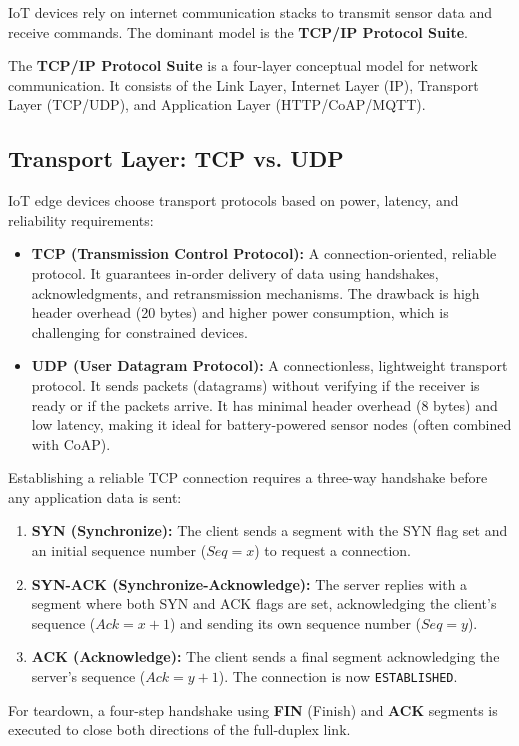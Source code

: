 \documentclass[12pt,a4paper]{article}
\begin{document}
IoT devices rely on internet communication stacks to transmit sensor data and receive commands. The dominant model is the \textbf{TCP/IP Protocol Suite}.

\begin{tcolorbox}[defbox, title={TCP/IP Protocol Suite}]
  The \textbf{TCP/IP Protocol Suite} is a four-layer conceptual model for network communication. It consists of the Link Layer, Internet Layer (IP), Transport Layer (TCP/UDP), and Application Layer (HTTP/CoAP/MQTT).
\end{tcolorbox}

\subsection{Transport Layer: TCP vs. UDP}
IoT edge devices choose transport protocols based on power, latency, and reliability requirements:
\begin{itemize}[leftmargin=*, itemsep=3pt]
  \item \textbf{TCP (Transmission Control Protocol):} A connection-oriented, reliable protocol. It guarantees in-order delivery of data using handshakes, acknowledgments, and retransmission mechanisms. The drawback is high header overhead (20 bytes) and higher power consumption, which is challenging for constrained devices.
  \item \textbf{UDP (User Datagram Protocol):} A connectionless, lightweight transport protocol. It sends packets (datagrams) without verifying if the receiver is ready or if the packets arrive. It has minimal header overhead (8 bytes) and low latency, making it ideal for battery-powered sensor nodes (often combined with CoAP).
\end{itemize}

\begin{tcolorbox}[examplebox, title={TCP Three-Way Handshake Connection Lifecycle}]
  Establishing a reliable TCP connection requires a three-way handshake before any application data is sent:
  \begin{enumerate}[leftmargin=*, itemsep=2pt]
    \item \textbf{SYN (Synchronize):} The client sends a segment with the SYN flag set and an initial sequence number ($Seq = x$) to request a connection.
    \item \textbf{SYN-ACK (Synchronize-Acknowledge):} The server replies with a segment where both SYN and ACK flags are set, acknowledging the client's sequence ($Ack = x+1$) and sending its own sequence number ($Seq = y$).
    \item \textbf{ACK (Acknowledge):} The client sends a final segment acknowledging the server's sequence ($Ack = y+1$). The connection is now \texttt{ESTABLISHED}.
  \end{enumerate}
  For teardown, a four-step handshake using \textbf{FIN} (Finish) and \textbf{ACK} segments is executed to close both directions of the full-duplex link.
\end{tcolorbox}
\end{document}
